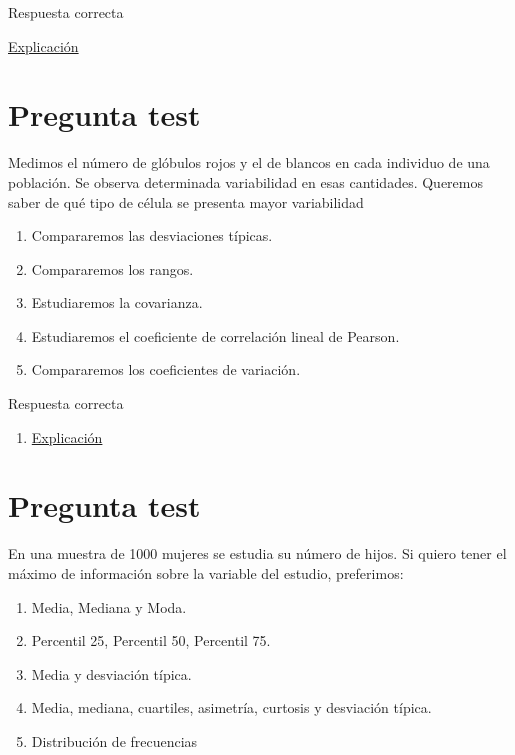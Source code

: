 \documentclass[
]{book}
\providecommand{\tightlist}{%
  \setlength{\itemsep}{0pt}\setlength{\parskip}{0pt}}
\begin{document}
Respuesta correcta

\href{https://1fjmanzano.github.io/bioestadistica/medidas-de-forma.html}{Explicación}

\hypertarget{pregunta-test-81}{%
\section{Pregunta test}\label{pregunta-test-81}}

Medimos el número de glóbulos rojos y el de blancos en cada individuo de una población. Se observa determinada variabilidad en esas cantidades. Queremos saber de qué tipo de célula se presenta mayor variabilidad

\begin{enumerate}
\def\labelenumi{\alph{enumi})}
\tightlist
\item
  Compararemos las desviaciones típicas.
\item
  Compararemos los rangos.
\item
  Estudiaremos la covarianza.
\item
  Estudiaremos el coeficiente de correlación lineal de Pearson.
\item
  Compararemos los coeficientes de variación.
\end{enumerate}

Respuesta correcta

\begin{enumerate}
\def\labelenumi{\alph{enumi})}
\setcounter{enumi}{4}
\tightlist
\item
  \href{https://en.wikipedia.org/wiki/Coefficient_of_variation}{Explicación}
\end{enumerate}

\hypertarget{pregunta-test-82}{%
\section{Pregunta test}\label{pregunta-test-82}}

En una muestra de 1000 mujeres se estudia su número de hijos. Si quiero tener el máximo de información sobre la variable del estudio, preferimos:

\begin{enumerate}
\def\labelenumi{\alph{enumi})}
\tightlist
\item
  Media, Mediana y Moda.
\item
  Percentil 25, Percentil 50, Percentil 75.
\item
  Media y desviación típica.
\item
  Media, mediana, cuartiles, asimetría, curtosis y desviación típica.
\item
  Distribución de frecuencias
\end{enumerate}
\end{document}
